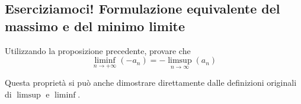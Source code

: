 \subsection{Eserciziamoci! Formulazione equivalente del massimo e del minimo limite}
\begin{exercisewt}\label{maxminlegame}
Utilizzando la proposizione precedente, provare che
\begin{equation}
	\liminf_{n\to +\infty}\left(-a_n\right)=-\limsup_{n\to\infty}\left(a_n\right)
\end{equation}
\end{exercisewt}
\begin{observe}
Questa proprietà si può anche dimostrare direttamente dalle definizioni originali di $\limsup$ e $\liminf$.
\end{observe}

